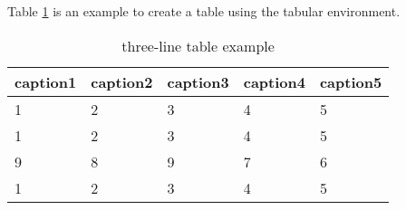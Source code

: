 \documentclass{article}
\begin{document}
Table \ref{tab:tabular1} is an example to create a table using the tabular environment.

\begin{table}[htbp]
    \caption{three-line table example}
    \label{tab:tabular1}
    \centering
    \begin{tabular}{lllll}
        \toprule
        caption1 & caption2 & caption3 & caption4 & caption5 \\
        \midrule
        1        & 2        & 3        & 4        & 5        \\
        1        & 2        & 3        & 4        & 5        \\
        9        & 8        & 9        & 7        & 6        \\
        1        & 2        & 3        & 4        & 5        \\
        \bottomrule
    \end{tabular}
\end{table}
\end{document}
